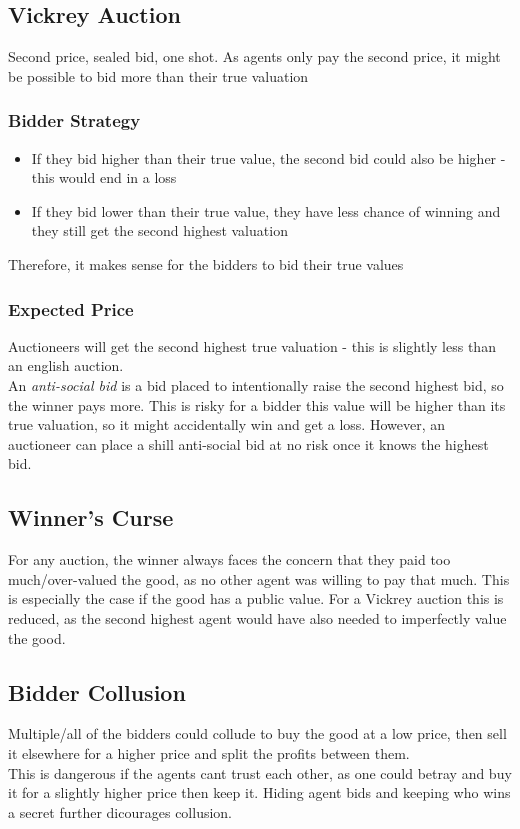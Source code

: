 \subsection{Vickrey Auction}
Second price, sealed bid, one shot. As agents only pay the second price, it might be possible to bid more than their true valuation

\subsubsection{Bidder Strategy}
\begin{itemize}
    \item If they bid higher than their true value, the second bid could also be higher - this would end in a loss
    \item If they bid lower than their true value, they have less chance of winning and they still get the second highest valuation
\end{itemize}
Therefore, it makes sense for the bidders to bid their true values

\subsubsection{Expected Price}
Auctioneers will get the second highest true valuation - this is slightly less than an english auction.\\

An \emph{anti-social bid} is a bid placed to intentionally raise the second highest bid, so the winner pays more. This is risky for a bidder this value will be higher than its true valuation, so it might accidentally win and get a loss. However, an auctioneer can place a shill anti-social bid at no risk once it knows the highest bid.

\subsection{Winner's Curse}
For any auction, the winner always faces the concern that they paid too much/over-valued the good, as no other agent was willing to pay that much. This is especially the case if the good has a public value. For a Vickrey auction this is reduced, as the second highest agent would have also needed to imperfectly value the good.

\subsection{Bidder Collusion}
Multiple/all of the bidders could collude to buy the good at a low price, then sell it elsewhere for a higher price and split the profits between them.\\
This is dangerous if the agents cant trust each other, as one could betray and buy it for a slightly higher price then keep it. Hiding agent bids and keeping who wins a secret further dicourages collusion.

